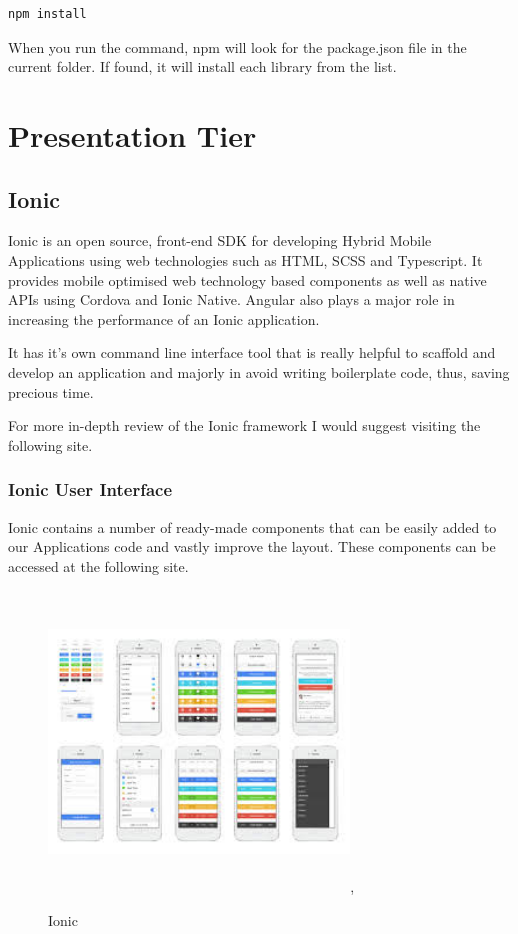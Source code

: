 \documentclass[12pt,a4paper,oneside,openany]{book}
\begin{document}
\begin{verbatim}
npm install
\end{verbatim}

When you run the command, npm will look for the package.json file in the current folder. If found, it will install each library from the list. \cite{npm}

\section{Presentation Tier}

\subsection{Ionic}
Ionic is an open source, front-end SDK for developing Hybrid Mobile Applications using web technologies such as HTML, SCSS and Typescript. It provides mobile optimised web technology based components as well as native APIs using Cordova and Ionic Native. Angular also plays a major role in increasing the performance of an Ionic application.

It has it’s own command line interface tool that is really helpful to scaffold and develop an application and majorly in avoid writing boilerplate code, thus, saving precious time. \cite{Ionic}

For more in-depth review of the Ionic framework I would suggest visiting the following site. \cite{ionicFrame}
\vfill{}

\subsubsection{Ionic User Interface}
Ionic contains a number of ready-made components that can be easily added to our Applications code and vastly improve the layout. These components can be accessed at the following site. \cite{ionicUI}

\begin{figure}[ht]
\renewcommand\thefigure{4.1}
\centering
\includegraphics[width=8cm, height=8cm]{Images/ionicUI.jpg},
\caption{Ionic}
\label{ionicUI}
\end{figure} 
\end{document}
